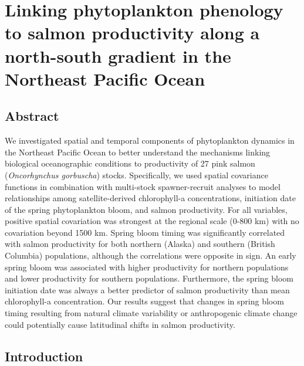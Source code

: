 
\chapter[Phytoplankton phenology and salmon productivity]{Linking
  phytoplankton phenology to salmon productivity along a north-south gradient in
  the Northeast Pacific Ocean\footnotemark[1]}
\label{ch:bloom}



\section{Abstract}

We investigated spatial and temporal components of phytoplankton dynamics in the
Northeast Pacific Ocean to better understand the mechanisms linking biological
oceanographic conditions to productivity of 27 pink salmon (\emph{Oncorhynchus
gorbuscha}) stocks. Specifically, we used spatial covariance functions in
combination with multi-stock spawner-recruit analyses to model relationships
among satellite-derived chlorophyll-a concentrations, initiation date of the
spring phytoplankton bloom, and salmon productivity. For all variables, positive
spatial covariation was strongest at the regional scale (0-800 km) with no
covariation beyond 1500 km. Spring bloom timing was significantly correlated
with salmon productivity for both northern (Alaska) and southern (British
Columbia) populations, although the correlations were opposite in sign. An early
spring bloom was associated with higher productivity for northern populations
and lower productivity for southern populations. Furthermore, the spring bloom
initiation date was always a better predictor of salmon productivity than mean
chlorophyll-a concentration. Our results suggest that changes in spring bloom
timing resulting from natural climate variability or anthropogenic climate
change could potentially cause latitudinal shifts in salmon productivity.



\section{Introduction}

